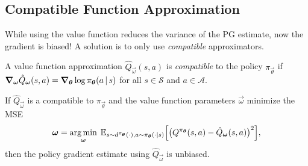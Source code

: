 		\subsection{Compatible Function Approximation}
			While using the value function reduces the variance of the \ac{PG} estimate, now the gradient is biased! A solution is to only use \emph{compatible} approximators.
			\begin{definition}
				A value function approximation \( \hat{Q}_{\vec{\omega}}(s, a) \) is \emph{compatible} to the policy \(\pi_{\vec{\theta}}\) if \( \grad_{\bm{\omega}} \hat{Q}_{\bm{\omega}}(s, a) = \grad_{\bm{\theta}} \log \pi_{\bm{\theta}}(a \,\vert\, s) \) for all \(s \in \mathcal{S}\) and \(a \in \mathcal{A}\).
			\end{definition}
			\begin{theorem}
				If \(\hat{Q}_{\vec{\omega}}\) is a compatible to \(\pi_{\vec{\theta}}\) and the value function parameters \(\vec{\omega}\) minimize the \ac{MSE}
				\begin{equation}
					\bm{\omega} = \operatorname*{arg\,min}_{\bm{\omega}} \; \mathbb{E}_{s \sim d^{\pi_{\bm{\theta}}}(\cdot), a \sim \pi_{\bm{\theta}}(\cdot \vert s)}\Bigl[ \bigl( Q^{\pi_{\bm{\theta}}}(s, a) - \hat{Q}_{\bm{\omega}}(s, a) \bigr)^2 \Bigr],
				\end{equation}
				then the policy gradient estimate using \(\hat{Q}_{\vec{\omega}}\) is unbiased.
			\end{theorem}
